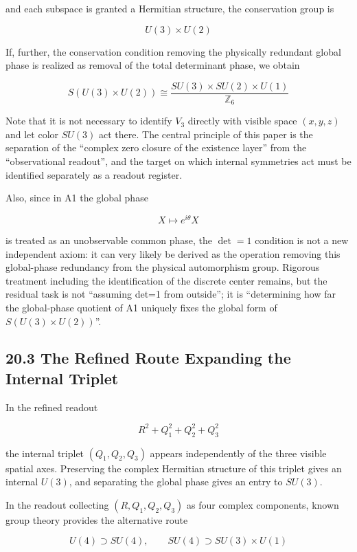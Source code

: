 \documentclass[
  a4paper,
]{article}
\begin{document}
and each subspace is granted a Hermitian structure, the conservation
group is

\[
U(3)\times U(2)
\]

If, further, the conservation condition removing the physically
redundant global phase is realized as removal of the total determinant
phase, we obtain

\[
\boxed{
S(U(3)\times U(2))
\cong
\frac{SU(3)\times SU(2)\times U(1)}{\mathbb Z_6}
}
\]

Note that it is not necessary to identify \(V_3\) directly with visible
space \((x,y,z)\) and let color \(SU(3)\) act there. The central
principle of this paper is the separation of the ``complex zero closure
of the existence layer'' from the ``observational readout'', and the
target on which internal symmetries act must be identified separately as
a readout register.

Also, since in A1 the global phase

\[
X\mapsto e^{i\theta}X
\]

is treated as an unobservable common phase, the \(\det=1\) condition is
not a new independent axiom: it can very likely be derived as the
operation removing this global-phase redundancy from the physical
automorphism group. Rigorous treatment including the identification of
the discrete center remains, but the residual task is not ``assuming
det=1 from outside''; it is ``determining how far the global-phase
quotient of A1 uniquely fixes the global form of
\(S(U(3)\times U(2))\)''.

\subsection{20.3 The Refined Route Expanding the Internal
Triplet}\label{the-refined-route-expanding-the-internal-triplet}

In the refined readout

\[
R^2+Q_1^2+Q_2^2+Q_3^2
\]

the internal triplet \((Q_1,Q_2,Q_3)\) appears independently of the
three visible spatial axes. Preserving the complex Hermitian structure
of this triplet gives an internal \(U(3)\), and separating the global
phase gives an entry to \(SU(3)\).

In the readout collecting \((R,Q_1,Q_2,Q_3)\) as four complex
components, known group theory provides the alternative route

\[
U(4)\supset SU(4),
\qquad
SU(4)\supset SU(3)\times U(1)
\]
\end{document}
